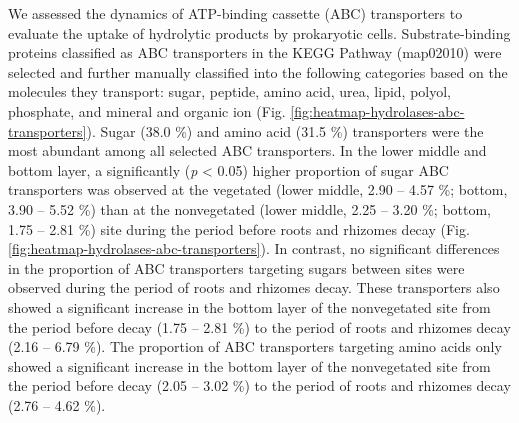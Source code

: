 \documentclass[
  12 pt,
]{article}
\begin{document}
We assessed the dynamics of ATP-binding cassette (ABC) transporters to evaluate the uptake of hydrolytic products by prokaryotic cells. Substrate-binding proteins classified as ABC transporters in the KEGG Pathway (map02010) were selected and further manually classified into the following categories based on the molecules they transport: sugar, peptide, amino acid, urea, lipid, polyol, phosphate, and mineral and organic ion (Fig. \ref{fig:heatmap-hydrolases-abc-transporters}). Sugar (38.0 \si{\percent}) and amino acid (31.5 \si{\percent}) transporters were the most abundant among all selected ABC transporters. In the lower middle and bottom layer, a significantly (\emph{p} \textless{} 0.05) higher proportion of sugar ABC transporters was observed at the vegetated (lower middle, 2.90 -- 4.57 \si{\percent}; bottom, 3.90 -- 5.52 \si{\percent}) than at the nonvegetated (lower middle, 2.25 -- 3.20 \si{\percent}; bottom, 1.75 -- 2.81 \si{\percent}) site during the period before roots and rhizomes decay (Fig. \ref{fig:heatmap-hydrolases-abc-transporters}). In contrast, no significant differences in the proportion of ABC transporters targeting sugars between sites were observed during the period of roots and rhizomes decay. These transporters also showed a significant increase in the bottom layer of the nonvegetated site from the period before decay (1.75 -- 2.81 \si{\percent}) to the period of roots and rhizomes decay (2.16 -- 6.79 \si{\percent}). The proportion of ABC transporters targeting amino acids only showed a significant increase in the bottom layer of the nonvegetated site from the period before decay (2.05 -- 3.02 \si{\percent}) to the period of roots and rhizomes decay (2.76 -- 4.62 \si{\percent}).
\end{document}

